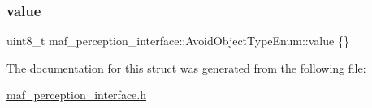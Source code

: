 \subsubsection{\texorpdfstring{value}{value}}
{\footnotesize\ttfamily uint8\+\_\+t maf\+\_\+perception\+\_\+interface\+::\+Avoid\+Object\+Type\+Enum\+::value \{\}}



The documentation for this struct was generated from the following file\+:\begin{DoxyCompactItemize}
\item 
\hyperlink{maf__perception__interface_8h}{maf\+\_\+perception\+\_\+interface.\+h}\end{DoxyCompactItemize}
